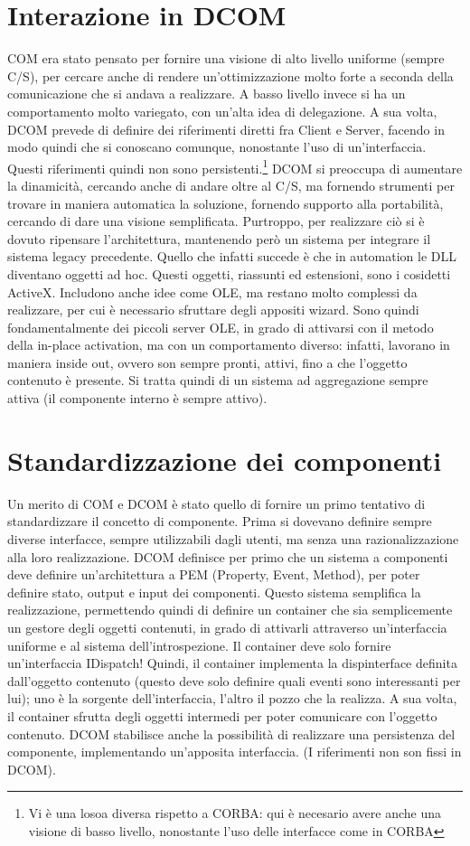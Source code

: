 \section{Interazione in DCOM}
COM era stato pensato per fornire una visione di alto livello uniforme (sempre C/S), per cercare anche di rendere
un'ottimizzazione molto forte a seconda della comunicazione che si andava a realizzare. A basso livello invece si ha un
comportamento molto variegato, con un'alta idea di delegazione.
A sua volta, DCOM prevede di definire dei riferimenti diretti fra Client e Server, facendo in modo quindi che si conoscano
comunque, nonostante l'uso di un'interfaccia. Questi riferimenti quindi non sono persistenti.\footnote{Vi è una losoa
diversa rispetto a CORBA: qui è necesario avere anche una visione di basso livello, nonostante l'uso delle interfacce
come in CORBA} DCOM si preoccupa di aumentare la dinamicità, cercando anche di andare oltre al C/S, ma fornendo
strumenti per trovare in maniera automatica la soluzione, fornendo supporto alla portabilità, cercando di dare una
visione semplificata. Purtroppo, per realizzare ciò si è dovuto ripensare l'architettura, mantenendo però un sistema per
integrare il sistema legacy precedente.
Quello che infatti succede è che in automation le DLL diventano oggetti ad hoc. Questi oggetti, riassunti ed
estensioni, sono i cosidetti ActiveX. Includono anche idee come OLE, ma restano molto complessi da realizzare, per cui è
necessario sfruttare degli appositi wizard. Sono quindi fondamentalmente dei piccoli server OLE, in grado di attivarsi
con il metodo della in-place activation, ma con un comportamento diverso: infatti, lavorano in maniera inside out,
ovvero son sempre pronti, attivi, fino a che l'oggetto contenuto è presente.
Si tratta quindi di un sistema ad aggregazione sempre attiva (il componente
interno è sempre attivo).
\section{Standardizzazione dei componenti}
Un merito di COM e DCOM è stato quello di fornire un primo tentativo di standardizzare il concetto di componente. Prima
si dovevano definire sempre diverse interfacce, sempre utilizzabili dagli utenti, ma senza una razionalizzazione alla
loro realizzazione.
DCOM definisce per primo che un sistema a componenti deve definire un'architettura a PEM (Property, Event, Method), per
poter definire stato, output e input dei componenti. Questo sistema semplifica la realizzazione, permettendo quindi di
definire un container che sia semplicemente un gestore degli oggetti contenuti, in grado di attivarli attraverso
un'interfaccia uniforme e al sistema dell'introspezione. Il container deve solo fornire un'interfaccia IDispatch!
Quindi, il container implementa la dispinterface definita dall'oggetto contenuto (questo deve solo definire quali eventi
sono interessanti per lui); uno è la sorgente dell'interfaccia, l'altro il pozzo che la realizza. A sua volta, il
container sfrutta degli oggetti intermedi per poter comunicare con l'oggetto contenuto.
DCOM stabilisce anche la possibilità di realizzare una persistenza del componente, implementando un'apposita
interfaccia. (I riferimenti non son fissi in DCOM).
